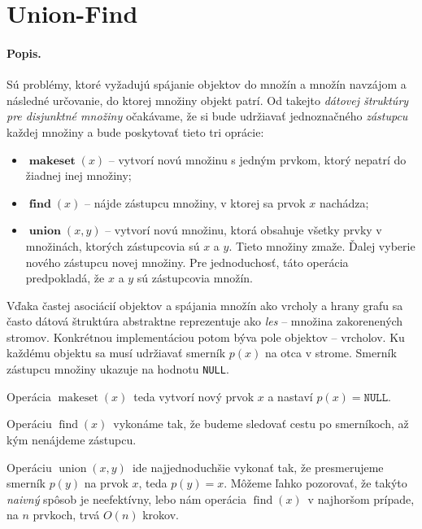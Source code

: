 \def\uf{Union-Find}
\def\null{\texttt{NULL}}
\def\makeset{$\mathop{makeset}\left( x\right)$}
\def\find{$\mathop{find}\left( x\right)$}
\def\union{$\mathop{union}\left( x, y\right)$}

\section{\uf}
\paragraph{Popis.}
Sú problémy, ktoré vyžadujú spájanie objektov do množín a množín navzájom 
a následné určovanie, do ktorej množiny objekt patrí. Od takejto \emph{
dátovej štruktúry pre disjunktné množiny} očakávame, že si bude udržiavať 
jednoznačného \emph{zástupcu} každej množiny a bude poskytovať 
tieto tri oprácie: 
\begin{itemize}
\item $\mathop{\mathbf{makeset}}\left( x\right)$ -- vytvorí novú množinu s jedným prvkom, 
ktorý nepatrí do žiadnej inej množiny;
\item $\mathop{\mathbf{find}}\left( x\right)$ -- nájde zástupcu množiny, v ktorej sa 
prvok $x$ nachádza;
\item $\mathop{\mathbf{union}}\left( x, y\right)$ -- vytvorí novú množinu, ktorá obsahuje 
všetky prvky v množinách, ktorých zástupcovia sú $x$ a $y$. Tieto 
množiny zmaže. Ďalej vyberie nového zástupcu novej množiny. Pre 
jednoduchosť, táto operácia predpokladá, že $x$ a $y$ sú 
zástupcovia množín.
\end{itemize}
Vďaka častej asociácií objektov a spájania množín ako vrcholy a hrany grafu 
sa často dátová štruktúra abstraktne reprezentuje ako 
\emph{les} -- množina zakorenených stromov. 
Konkrétnou implementáciou potom býva pole objektov -- vrcholov. Ku každému 
objektu sa musí udržiavať smerník $p(x)$ na otca v strome. Smerník zástupcu 
množiny ukazuje na hodnotu \null.

Operácia \makeset\ teda vytvorí nový prvok $x$ a nastaví $p(x) = \null$. 

Operáciu \find\ vykonáme tak, že budeme sledovať cestu po smerníkoch, až 
kým nenájdeme zástupcu. 

Operáciu \union\ ide najjednoduchšie vykonať tak, že presmerujeme smerník 
$p(y)$ na prvok $x$, teda $p(y) = x$. 
Môžeme ľahko pozorovať, že takýto \emph{naivný} spôsob je neefektívny, 
lebo nám operácia \find\ v najhoršom prípade, na $n$ prvkoch, trvá $O(n)$ 
krokov. 

